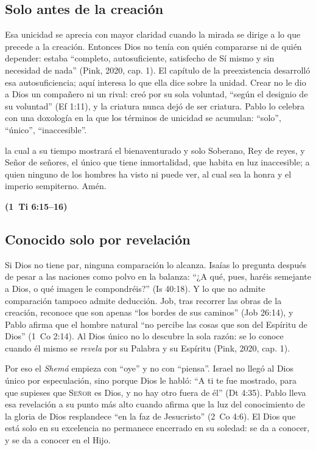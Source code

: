 \documentclass[11pt,letterpaper]{article}
\newcommand{\SENOR}{\textsc{Señor}}
\newcommand{\fuente}[1]{\par\hfill{\upshape\bfseries\small\textcolor{azul}{#1}}}
\begin{document}
\subsection{Solo antes de la creación}

Esa unicidad se aprecia con mayor claridad cuando la mirada se dirige a lo que precede a la creación. Entonces Dios no tenía con quién compararse ni de quién depender: estaba ``completo, autosuficiente, satisfecho de Sí mismo y sin necesidad de nada'' (Pink, 2020, cap. 1). El capítulo de la preexistencia desarrolló esa autosuficiencia; aquí interesa lo que ella dice sobre la unidad. Crear no le dio a Dios un compañero ni un rival: creó por su sola voluntad, ``según el designio de su voluntad'' (Ef 1:11), y la criatura nunca dejó de ser criatura. Pablo lo celebra con una doxología en la que los términos de unicidad se acumulan: ``solo'', ``único'', ``inaccesible''.

\begin{cita}la cual a su tiempo mostrará el bienaventurado y solo Soberano, Rey de reyes, y Señor de señores, el único que tiene inmortalidad, que habita en luz inaccesible; a quien ninguno de los hombres ha visto ni puede ver, al cual sea la honra y el imperio sempiterno. Amén.\fuente{(1~Ti 6:15--16)}\end{cita}

\subsection{Conocido solo por revelación}

Si Dios no tiene par, ninguna comparación lo alcanza. Isaías lo pregunta después de pesar a las naciones como polvo en la balanza: ``¿A qué, pues, haréis semejante a Dios, o qué imagen le compondréis?'' (Is 40:18). Y lo que no admite comparación tampoco admite deducción. Job, tras recorrer las obras de la creación, reconoce que son apenas ``los bordes de sus caminos'' (Job 26:14), y Pablo afirma que el hombre natural ``no percibe las cosas que son del Espíritu de Dios'' (1~Co 2:14). Al Dios único no lo descubre la sola razón: se lo conoce cuando él mismo se \emph{revela} por su Palabra y su Espíritu (Pink, 2020, cap. 1).

Por eso el \emph{Shemá} empieza con ``oye'' y no con ``piensa''. Israel no llegó al Dios único por especulación, sino porque Dios le habló: ``A ti te fue mostrado, para que supieses que \SENOR{} es Dios, y no hay otro fuera de él'' (Dt 4:35). Pablo lleva esa revelación a su punto más alto cuando afirma que la luz del conocimiento de la gloria de Dios resplandece ``en la faz de Jesucristo'' (2~Co 4:6). El Dios que está solo en su excelencia no permanece encerrado en su soledad: se da a conocer, y se da a conocer en el Hijo.
\end{document}
